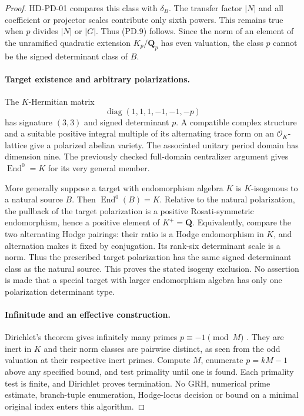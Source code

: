 \begin{proof}
HD-PD-01 compares this class with $\delta_B$.
The transfer factor $|N|$ and all coefficient or projector
scales contribute only sixth powers.  This remains true when
$p$ divides $|N|$ or $|G|$.
Thus (PD.9) follows.  Since the norm of an element of the
unramified quadratic extension $K_p/\mathbf Q_p$ has even
valuation, the class $p$ cannot be the signed determinant
class of $B$.

\paragraph{Target existence and arbitrary polarizations.}
The $K$-Hermitian matrix
\[
                    \operatorname{diag}(1,1,1,-1,-1,-p)
 \tag{PD.18}
\]
has signature $(3,3)$ and signed determinant $p$.
A compatible complex structure and a suitable positive
integral multiple of its alternating trace form on an
$\mathcal O_K$-lattice give a polarized abelian variety.
The associated unitary period domain has dimension nine.
The previously checked full-domain centralizer argument
gives $\operatorname{End}^0=K$ for its very general member.

More generally suppose a target with endomorphism algebra
$K$ is $K$-isogenous to a natural source $B$.
Then $\operatorname{End}^0(B)=K$.
Relative to the natural polarization, the pullback of the
target polarization is a positive Rosati-symmetric
endomorphism, hence a positive element of $K^+=\mathbf Q$.
Equivalently, compare the two alternating Hodge pairings:
their ratio is a Hodge endomorphism in $K$, and alternation
makes it fixed by conjugation.  Its rank-six determinant
scale is a norm.  Thus the prescribed target polarization
has the same signed determinant class as the natural source.
This proves the stated isogeny exclusion.  No assertion is
made that a special target with larger endomorphism algebra
has only one polarization determinant type.

\paragraph{Infinitude and an effective construction.}
Dirichlet's theorem gives infinitely many primes
$p\equiv-1\pmod M$
\cite[Section 1, p.~63]{PD:Harrison2009}.
They are inert in $K$ and their norm classes are pairwise
distinct, as seen from the odd valuation at their respective
inert primes.  Compute $M$, enumerate $p=kM-1$ above any
specified bound, and test primality until one is found.
Each primality test is finite, and Dirichlet proves termination.
No GRH, numerical prime estimate, branch-tuple enumeration,
Hodge-locus decision or bound on a minimal original index
enters this algorithm.
\end{proof}

